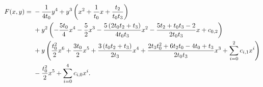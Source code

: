 \begin{align}
    \label{curve:ising_vacant}
    F(x,y)={} & -\frac{1}{4 t_0}y^{4}{}+y^{3}\left(x^{2} + \frac{1}{t_0}x + \frac{t_2}{t_0 t_3}\right)\notag \\
              & {}+y^{2}\left(-\frac{5 t_0}{4}x^{4} - \frac{5}{2}x^{3} - \frac{5 \left(2 t_0 t_2+t_3\right)}{4 t_0 t_3}x^{2} - \frac{5 t_2+t_0 t_3-2}{2 t_0 t_3}x + c_{0,2}\right)\notag \\
              & {}+y\left(\frac{t_0^2}{2}x^{6} + \frac{3 t_0}{2}x^{5} + \frac{3 \left(t_0 t_2+t_3\right)}{2 t_3}x^{4} + \frac{2 t_3 t_0^2+6 t_2 t_0-4 t_0+t_3}{2 t_0 t_3}x^{3} + \sum_{i=0}^{2}c_{i,1}x^i\right)\notag \\
              & {}-\frac{t_0^2}{2}x^{5} + \sum_{i=0}^{4}c_{i,0}x^i.
\end{align}
